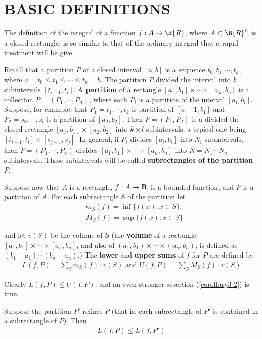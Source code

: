 \section{BASIC DEFINITIONS}
The definition of the integral of a function $f: A\to \B{R}$, where $A\subset \B{R}^n$
is a closed rectangle, is so similar to that of the ordinary integral that 
a rapid treatment will be give.

Recall that a partition $P$ of a closed interval $[a,b]$ is a
sequence $t_0, t_1, \cdots, t_k$, where $a=t_0\le t_1 \le \cdots \le t_k=b$.
The partition $P$ divided the interval into $k$ subintervals $[t_{i-1}, t_i]$.
A \textbf{partition} of a rectangle $[a_1, b_1]\times \cdots \times [a_n, b_n]$
is a collection $P=(P_1, \cdots, P_n)$, where each $P_i$ is a partition of the interval 
$[a_i, b_i]$. Suppose, for example, that $P_1=t_1,\cdots, t_k$ is partition of 
$[a-1, b_1]$ and $P_2=s_0, \cdots, s_l$ is a partition of $[a_2, b_2]$. Then 
$P=(P_1, P_2)$ is a divided the closed rectangle $[a_1, b_1]\times [a_2,b_2]$ into 
$k\times l$ subintervals, a typical one being $[t_{i-1}, t_i]\times [s_{j-1}, s_j]$.
In general, if $P_i$ divides $[a_i, b_i]$ into $N_i$ subintervals, then 
$P=(P_1, \cdots, P_n)$ divides $[a_1, b_1]\times \cdots \times [a_n, b_n]$ into 
$N = N_1 \cdots N_n$ subintervals. These subintervals will be called 
\textbf{subrectangles of the partition} $P$. 

Suppose now that $A$ is a rectangle, $f: A\to \mathbf{R}$ is a bounded function, and $P$ is a 
partition of $A$. For each subrectangle $S$ of the partition let
\begin{align*}
    & {m}_S(f) = \inf \{f(x):x\in S\},\\
    & {M}_S(f) = \sup \{f(x):x\in S\}
\end{align*}

and let $v(S)$ be the volume of $S$ (the \textbf{volume} of a rectangle 
$[a_1, b_1]\times \cdots\times [a_n, b_n]$, and also of $(a_1, b_1)\times \cdots\times (a_n, b_n)$,
is defined as $(b_1-a_1)\cdots (b_n-a_n)$.) The \textbf{lower} and \textbf{upper sums} of $f$ 
for $P$ are defined by
\begin{align*}
    L(f, P) 
    = \sum_{S }^{}{m_S(f)\cdot v(S)} \text{ and } 
    U(f, P) = \sum_{S}^{}{M_S(f)\cdot v(S)}
\end{align*}

Clearly $L(f, P)\le U(f, P)$, and an even stronger assertion (\ref{corollary3-2})
is true.

\begin{lemma}
    Suppose the partition $P'$ refines $P$ (that is, each subrectangle of $P'$
    is contained in a subrectangle of $P$). Then 
    \begin{align*}
        L(f, P) \le L(f, P')
    \end{align*}
    \label{lemma3-1}
\end{lemma}

